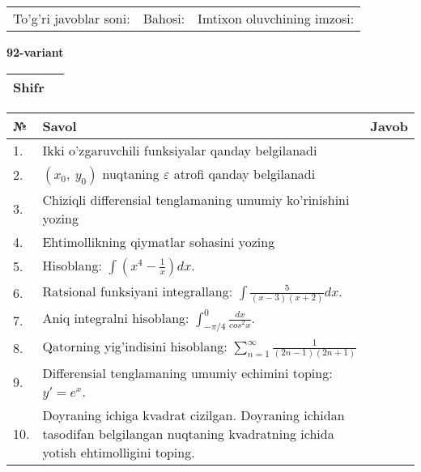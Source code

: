 \documentclass{article}
\begin{document}
  \vspace{1cm}
  
  \begin{tabular}{lll}
  To'g'ri javoblar soni: \underline{\hspace{1.5cm}} & 
  Bahosi: \underline{\hspace{1.5cm}} & 
  Imtixon oluvchining imzosi: \underline{\hspace{2cm}} \\
  \end{tabular}
  
  \egroup
  
  \newpage
  
  
  \textbf{92-variant}\\
  
  \bgroup
  \def\arraystretch{1.6} %
  
  \begin{tabular}{|m{5.7cm}|m{9.5cm}|}
  \hline
  Shifr & \\
  \hline
  \end{tabular}
  
  \vspace{1cm}
  
  \begin{tabular}{|m{0.7cm}|m{10cm}|m{4cm}|}
  \hline
  № & Savol & Javob \\
  \hline
  1. & Ikki o'zgaruvchili funksiyalar qanday belgilanadi &  \\
  \hline
  2. & \((x_{0},\ y_{0})\) nuqtaning \(\varepsilon\) atrofi qanday belgilanadi &  \\
  \hline
  3. & Chiziqli differensial tenglamaning umumiy ko'rinishini yozing &  \\
  \hline
  4. & Ehtimollikning qiymatlar sohasini yozing &  \\
  \hline
  5. & Hisoblang: \(\int \left( x^{4} - \frac{1}{x} \right)dx\). &  \\
  \hline
  6. & Ratsional funksiyani integrallang: \(\int {\frac{5}{(x - 3)(x + 2)}dx}\). &  \\
  \hline
  7. & Aniq integralni hisoblang: \(\int_{- \pi/4}^{0}\frac{dx}{cos^{2}x}\). &  \\
  \hline
  8. & Qatorning yig'indisini hisoblang: \(\sum_{n = 1}^{\infty}\frac{1}{(2n - 1)(2n + 1)}\) &  \\
  \hline
  9. & Differensial tenglamaning umumiy echimini toping: \(y' = e^{x}\). &  \\
  \hline
  10. & Doyraning ichiga kvadrat cizilgan. Doyraning ichidan tasodifan belgilangan nuqtaning kvadratning ichida yotish ehtimolligini toping. &  \\
  \hline
  \end{tabular}
  
\end{document}
